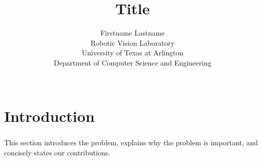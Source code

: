 \documentclass{beamer}
\begin{document}
\title[Title]{Title}
\author[]{Firstname Lastname\\
Robotic Vision Laboratory\\
University of Texas at Arlington\\
Department of Computer Science and Engineering\\
\begin{figure}[]
\centering
{}
\hspace{10mm}
\end{figure}
}


\begin{frame}
\titlepage
\end{frame}
%
%


\section{Introduction}
\begin{frame}
\frametitle{}
This section introduces the problem, explains why the problem is important, and 
concisely states our contributions. 
\end{frame}
%
%
\end{document}
